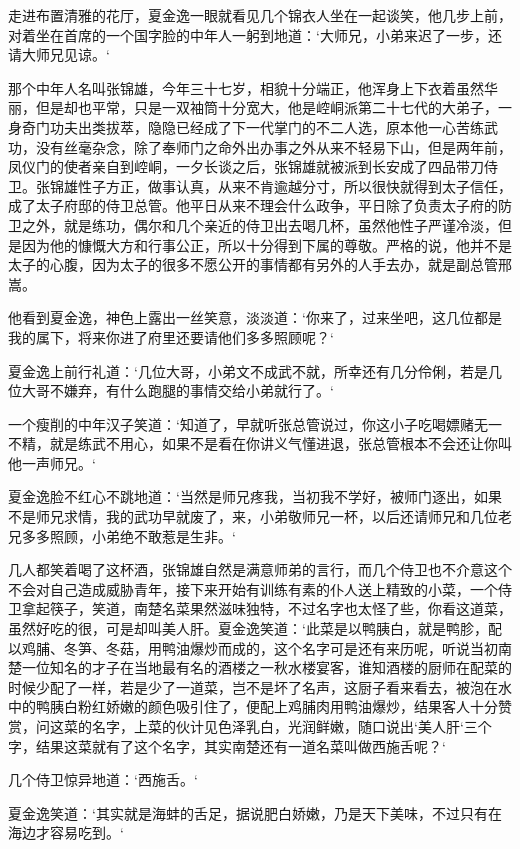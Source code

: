 走进布置清雅的花厅，夏金逸一眼就看见几个锦衣人坐在一起谈笑，他几步上前，对着坐在首席的一个国字脸的中年人一躬到地道：‘大师兄，小弟来迟了一步，还请大师兄见谅。‘

那个中年人名叫张锦雄，今年三十七岁，相貌十分端正，他浑身上下衣着虽然华丽，但是却也平常，只是一双袖筒十分宽大，他是崆峒派第二十七代的大弟子，一身奇门功夫出类拔萃，隐隐已经成了下一代掌门的不二人选，原本他一心苦练武功，没有丝毫杂念，除了奉师门之命外出办事之外从来不轻易下山，但是两年前，凤仪门的使者亲自到崆峒，一夕长谈之后，张锦雄就被派到长安成了四品带刀侍卫。张锦雄性子方正，做事认真，从来不肯逾越分寸，所以很快就得到太子信任，成了太子府邸的侍卫总管。他平日从来不理会什么政争，平日除了负责太子府的防卫之外，就是练功，偶尔和几个亲近的侍卫出去喝几杯，虽然他性子严谨冷淡，但是因为他的慷慨大方和行事公正，所以十分得到下属的尊敬。严格的说，他并不是太子的心腹，因为太子的很多不愿公开的事情都有另外的人手去办，就是副总管邢嵩。

他看到夏金逸，神色上露出一丝笑意，淡淡道：‘你来了，过来坐吧，这几位都是我的属下，将来你进了府里还要请他们多多照顾呢？‘

夏金逸上前行礼道：‘几位大哥，小弟文不成武不就，所幸还有几分伶俐，若是几位大哥不嫌弃，有什么跑腿的事情交给小弟就行了。‘

一个瘦削的中年汉子笑道：‘知道了，早就听张总管说过，你这小子吃喝嫖赌无一不精，就是练武不用心，如果不是看在你讲义气懂进退，张总管根本不会还让你叫他一声师兄。‘

夏金逸脸不红心不跳地道：‘当然是师兄疼我，当初我不学好，被师门逐出，如果不是师兄求情，我的武功早就废了，来，小弟敬师兄一杯，以后还请师兄和几位老兄多多照顾，小弟绝不敢惹是生非。‘

几人都笑着喝了这杯酒，张锦雄自然是满意师弟的言行，而几个侍卫也不介意这个不会对自己造成威胁青年，接下来开始有训练有素的仆人送上精致的小菜，一个侍卫拿起筷子，笑道，南楚名菜果然滋味独特，不过名字也太怪了些，你看这道菜，虽然好吃的很，可是却叫美人肝。夏金逸笑道：‘此菜是以鸭胰白，就是鸭胗，配以鸡脯、冬笋、冬菇，用鸭油爆炒而成的，这个名字可是还有来历呢，听说当初南楚一位知名的才子在当地最有名的酒楼之一秋水楼宴客，谁知酒楼的厨师在配菜的时候少配了一样，若是少了一道菜，岂不是坏了名声，这厨子看来看去，被泡在水中的鸭胰白粉红娇嫩的颜色吸引住了，便配上鸡脯肉用鸭油爆炒，结果客人十分赞赏，问这菜的名字，上菜的伙计见色泽乳白，光润鲜嫩，随口说出‘美人肝‘三个字，结果这菜就有了这个名字，其实南楚还有一道名菜叫做西施舌呢？‘

几个侍卫惊异地道：‘西施舌。‘

夏金逸笑道：‘其实就是海蚌的舌足，据说肥白娇嫩，乃是天下美味，不过只有在海边才容易吃到。‘

